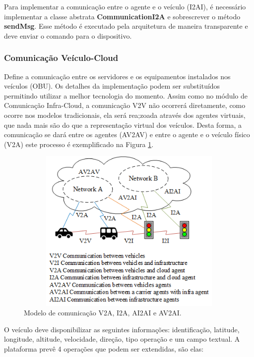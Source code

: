 \documentclass[
	12pt,				%
	oneside,			%
	a4paper,			%
	english,			%
	brazil				%
	]{abntex2ppgsi}
\begin{document}
Para implementar a comunicação entre o agente e o veículo (I2AI), é necessário implementar a classe abstrata \textbf{CommunicationI2A} e sobrescrever o método \textbf{sendMsg}. Esse método é executado pela arquitetura de maneira transparente e deve enviar o comando para o dispositivo. 


\subsubsection{Comunicação Veículo-Cloud}

Define a comunicação entre os servidores e os equipamentos instalados nos veículos (OBU). Os detalhes da implementação podem ser substituídos permitindo utilizar a melhor tecnologia do momento. Assim como no módulo de Comunicação Infra-Cloud, a comunicação V2V não ocorrerá diretamente, como ocorre nos modelos tradicionais, ela será rea;zoada através dos agentes virtuais, que nada mais são do que a representação virtual dos veículos. Desta forma, a comunicação se dará entre os agentes (AV2AV) e entre o agente e o veículo físico (V2A) este processo é exemplificado na Figura \ref{fig:dComunicacaoAgentes}.
  
\begin{figure}[!h]
	\centering
	\includegraphics [width=12cm,height=8cm] {images/agentemoveis_virtuais.png}
	\caption{Modelo de comunicação V2A, I2A, AI2AI e AV2AI.}
	\label{fig:dComunicacaoAgentes}
\end{figure}

O veículo deve disponibilizar as seguintes informações: identificação, latitude, longitude, altitude, velocidade, direção, tipo operação e um campo textual. A plataforma prevê 4 operações que podem ser extendidas, são elas:
\end{document}
